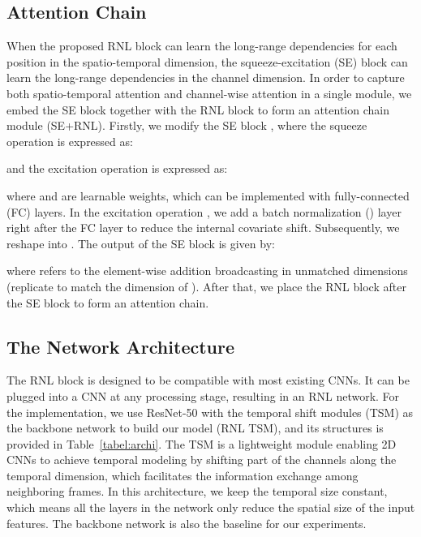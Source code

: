 \documentclass[a4paper,conference]{IEEEtran}
\begin{document}
\vspace*{-0.1cm}
 \subsection{Attention Chain}
 \label{sec_att_chain}

When the proposed RNL block can learn the long-range dependencies for each position in the spatio-temporal dimension, the squeeze-excitation (SE) block \cite{Hu_2018_CVPR} can learn the long-range dependencies in the channel dimension. In order to capture both spatio-temporal attention and channel-wise attention in a single module, we embed the SE block \cite{Hu_2018_CVPR} together with the RNL block to form an attention chain module (SE+RNL). Firstly, we modify the SE block \cite{Hu_2018_CVPR}, where the squeeze operation  is expressed as:

and the excitation operation  is expressed as:


where  and  are learnable weights, which can be implemented with fully-connected (FC) layers. In the excitation operation , we add a batch normalization () layer \cite{szegedy2015bn} right after the FC layer  to reduce the internal covariate shift. Subsequently, we reshape  into . The output of the SE block is given by:

where  refers to the element-wise addition broadcasting in unmatched dimensions (replicate  to match the dimension of ). After that, we place the RNL block after the SE block to form an attention chain.

\subsection{The Network Architecture}


The RNL block is designed to be compatible with most existing CNNs. It can be plugged into a CNN at any processing stage, resulting in an RNL network. For the implementation, we use ResNet-50 \cite{he2016deep} with the temporal shift modules (TSM) \cite{lin2019tsm} as the backbone network to build our model (RNL TSM), and its structures is provided in Table~\ref{tabel:archi}. The TSM is a lightweight module enabling 2D CNNs to achieve temporal modeling by shifting part of the channels along the temporal dimension, which facilitates the information exchange among neighboring frames. In this architecture, we keep the temporal size constant, which means all the layers in the network only reduce the spatial size of the input features. The backbone network is also the baseline for our experiments. 
\end{document}
